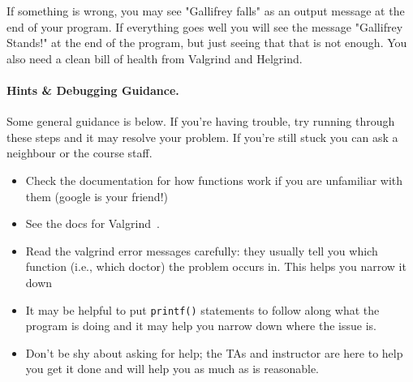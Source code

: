 If something is wrong, you may see "Gallifrey falls" as an output message at the end of your program. If everything goes well you will see the message "Gallifrey Stands!" at the end of the program, but just seeing that that is not enough. You also need a clean bill of health from Valgrind and Helgrind.

\paragraph{Hints \& Debugging Guidance.}

Some general guidance is below. If you're having trouble, try running through these steps and it may resolve your problem. If you're still stuck you can ask a neighbour or the course staff.
\begin{itemize}
	\item Check the documentation for how functions work if you are unfamiliar with them (google is your friend!)
	\item See the docs for Valgrind~\cite{valgrind:tools}.
	\item Read the valgrind error messages carefully: they usually tell you which function (i.e., which doctor) the problem occurs in. This helps you narrow it down 
	\item It may be helpful to put \texttt{printf()} statements to follow along what the program is doing and it may help you narrow down where the issue is.
	\item Don't be shy about asking for help; the TAs and instructor are here to help you get it done and will help you as much as is reasonable.
\end{itemize}




